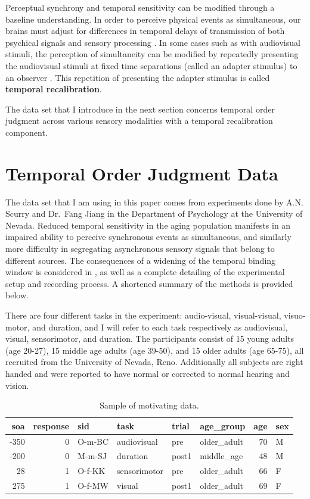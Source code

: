 \documentclass[11pt, oneside, openany]{scrbook}
\begin{document}
Perceptual synchrony and temporal sensitivity can be modified through a baseline understanding. In order to perceive physical events as simultaneous, our brains must adjust for differences in temporal delays of transmission of both psychical signals and sensory processing \citep{fujisaki2004recalibration}. In some cases such as with audiovisual stimuli, the perception of simultaneity can be modified by repeatedly presenting the audiovisual stimuli at fixed time separations (called an adapter stimulus) to an observer \citep{vroomen2004recalibration}. This repetition of presenting the adapter stimulus is called \textbf{temporal recalibration}.

The data set that I introduce in the next section concerns temporal order judgment across various sensory modalities with a temporal recalibration component.

\hypertarget{toj-task}{%
\section{Temporal Order Judgment Data}\label{toj-task}}

The data set that I am using in this paper comes from experiments done by A.N. Scurry and Dr.~Fang Jiang in the Department of Psychology at the University of Nevada. Reduced temporal sensitivity in the aging population manifests in an impaired ability to perceive synchronous events as simultaneous, and similarly more difficulty in segregating asynchronous sensory signals that belong to different sources. The consequences of a widening of the temporal binding window is considered in \citet{scurry2019aging}, as well as a complete detailing of the experimental setup and recording process. A shortened summary of the methods is provided below.

There are four different tasks in the experiment: audio-visual, visual-visual, visuo-motor, and duration, and I will refer to each task respectively as audiovisual, visual, sensorimotor, and duration. The participants consist of 15 young adults (age 20-27), 15 middle age adults (age 39-50), and 15 older adults (age 65-75), all recruited from the University of Nevada, Reno. Additionally all subjects are right handed and were reported to have normal or corrected to normal hearing and vision.

\begin{table}[!h]

\caption{\label{tab:multitask-data}Sample of motivating data.}
\centering
\begin{tabular}[t]{rrllllrl}
\toprule
soa & response & sid & task & trial & age\_group & age & sex\\
\midrule
-350 & 0 & O-m-BC & audiovisual & pre & older\_adult & 70 & M\\
-200 & 0 & M-m-SJ & duration & post1 & middle\_age & 48 & M\\
28 & 1 & O-f-KK & sensorimotor & pre & older\_adult & 66 & F\\
275 & 1 & O-f-MW & visual & post1 & older\_adult & 69 & F\\
\bottomrule
\end{tabular}
\end{table}
\end{document}
